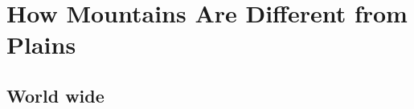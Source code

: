 \begin{sloppypar}
\section{How Mountains Are Different from Plains}
\subsection{World wide}
\label{mountainww}



\end{sloppypar}
